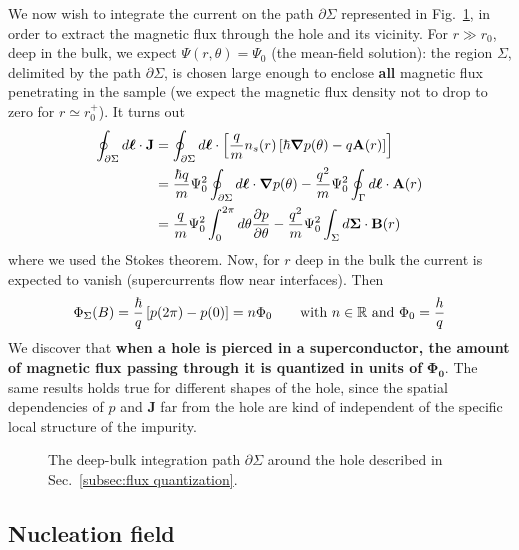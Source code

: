 We now wish to integrate the current on the path $\partial\Sigma$ represented in Fig.~\ref{fig:hole and path in superconductor}, in order to extract the magnetic flux through the hole and its vicinity. For $r \gg r_0$, deep in the bulk, we expect $\Psi(r,\theta) = \Psi_0$ (the mean-field solution): the region $\Sigma$, delimited by the path $\partial\Sigma$, is chosen large enough to enclose \textbf{all} magnetic flux penetrating in the sample (we expect the magnetic flux density not to drop to zero for $r \simeq r_0^+$). It turns out
\[
\begin{aligned}
    \oint_{\partial\Sigma} d\bm{\ell}\cdot\mathbf{J} &= \oint_{\partial\Sigma} d\bm{\ell}\cdot \left[{\frac{q}{m} n_s(r) \left[{ \hbar \grad p(\theta) - q \mathbf{A}(r)}\right]}\right] \\
    &= \frac{\hbar q}{m} \Psi_0^2 \oint_{\partial\Sigma} d\bm{\ell}\cdot\grad p(\theta) - \frac{q^2}{m} \Psi_0^2 \oint_\Gamma d\bm{\ell}\cdot\mathbf{A}(r) \\
    &= \frac{q}{m} \Psi_0^2 \int_0^{2\pi} d\theta \pdv{p}{\theta} - \frac{q^2}{m} \Psi_0^2 \int_\Sigma d\bm\Sigma\cdot\mathbf{B}(r) 
\end{aligned}
\]
where we used the Stokes theorem. Now, for $r$ deep in the bulk the current is expected to vanish (supercurrents flow near interfaces). Then
\[
    \Phi_\Sigma(B) = \frac{\hbar}{q} \left[{p(2\pi)-p(0)}\right] = n \Phi_0
    \hspace{2em}\text{with $n\in\mathbb{R}$ and $\displaystyle\Phi_0=\frac{h}{q}$}
\]
We discover that \textbf{when a hole is pierced in a superconductor, the amount of magnetic flux passing through it is quantized in units of} $\bm{\Phi_0}$. The same results holds true for different shapes of the hole, since the spatial dependencies of $p$ and $\mathbf{J}$ far from the hole are kind of independent of the specific local structure of the impurity.

\begin{figure}
    \centering
    
    \caption{The deep-bulk integration path $\partial\Sigma$ around the hole described in Sec.~\ref{subsec:flux quantization}.}
    \label{fig:hole and path in superconductor}
\end{figure}

\subsection{Nucleation field}\label{subsec:nucleation field}

